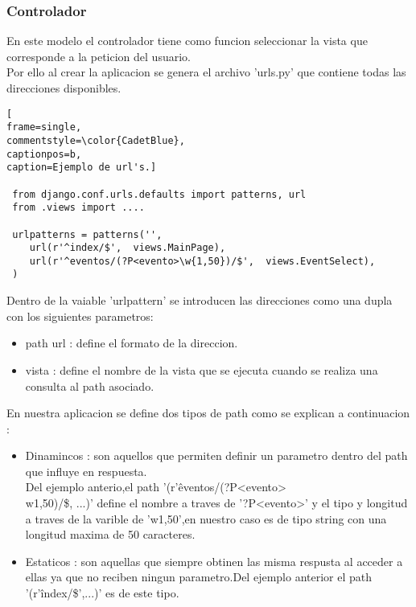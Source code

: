 \subsubsection{Controlador}
En este modelo el controlador tiene como funcion seleccionar la vista que corresponde a la peticion del usuario.
\\Por ello al crear la aplicacion se genera el archivo 'urls.py' que contiene todas las direcciones disponibles.
\begin{lstlisting}[
frame=single,
commentstyle=\color{CadetBlue},
captionpos=b,
caption=Ejemplo de url's.]

 from django.conf.urls.defaults import patterns, url
 from .views import ....

 urlpatterns = patterns('',
 	url(r'^index/$',  views.MainPage),
	url(r'^eventos/(?P<evento>\w{1,50})/$',  views.EventSelect),
 )
\end{lstlisting}
Dentro de la vaiable 'urlpattern' se introducen las direcciones como una dupla con los siguientes parametros:
\begin{itemize}
\item path url : define el formato de la direccion.
\item vista : define el nombre de la vista que se ejecuta cuando se realiza una consulta al path asociado.
\end{itemize}
En nuestra aplicacion se define dos tipos de path como se explican a continuacion :
\begin{itemize}
\item Dinamincos : son aquellos que permiten definir un parametro dentro del path que influye en respuesta.
\\Del ejemplo anterio,el path '(r'\^ eventos/(?P<evento>\\w{1,50})/\$, ...)' define el nombre a traves de '?P<evento>' y el tipo y longitud a traves de la varible de 'w{1,50}',en nuestro caso es de tipo string con una longitud maxima de 50 caracteres.
\item Estaticos : son aquellas que siempre obtinen las misma respusta al acceder a ellas ya que no reciben ningun parametro.Del ejemplo anterior el path '(r'\^index/\$',...)' es de este tipo.
\end{itemize}
